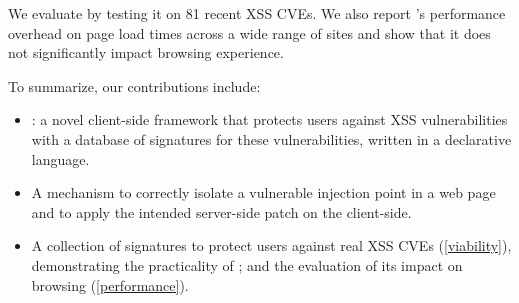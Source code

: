 

We evaluate \sys by
testing it on 81 recent \ac{XSS} CVEs. %
%
We also report \sys{}'s performance overhead on page load times
across a wide range of sites and show that it does not significantly
impact browsing experience.

To summarize, our contributions include:
\begin{itemize}

	\item \sys: a novel client-side framework that protects
          users against XSS vulnerabilities with a database of
          signatures for these vulnerabilities, written in a
          declarative language.

	\item A mechanism to correctly isolate a vulnerable injection
          point in a web page and to apply the intended server-side
          patch on the client-side.

	\item A collection of signatures to protect users against
          real XSS CVEs (\autoref{viability}), demonstrating the practicality
          of \sys; and the evaluation of its impact on browsing (\autoref{performance}). %

\end{itemize}
